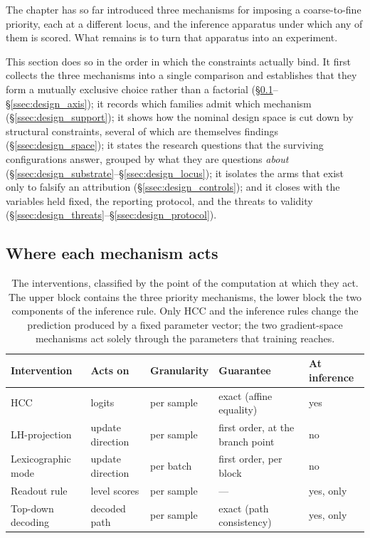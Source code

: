 The chapter has so far introduced three mechanisms for imposing a coarse-to-fine
priority, each at a different locus, and the inference apparatus under which any
of them is scored. What remains is to turn that apparatus into an experiment.

This section does so in the order in which the constraints actually bind. It
first collects the three mechanisms into a single comparison and establishes that
they form a mutually exclusive choice rather than a factorial
(\S\ref{ssec:design_mechanisms}--\S\ref{ssec:design_axis}); it records which
families admit which mechanism (\S\ref{ssec:design_support}); it shows how the
nominal design space is cut down by structural constraints, several of which are
themselves findings (\S\ref{ssec:design_space}); it states the research questions
that the surviving configurations answer, grouped by what they are questions
\emph{about} (\S\ref{ssec:design_substrate}--\S\ref{ssec:design_locus}); it
isolates the arms that exist only to falsify an attribution
(\S\ref{ssec:design_controls}); and it closes with the variables held fixed, the
reporting protocol, and the threats to validity
(\S\ref{ssec:design_threats}--\S\ref{ssec:design_protocol}).

\subsection{Where each mechanism acts}
\label{ssec:design_mechanisms}

\begin{table}[htbp]
\centering
\small
\begin{tabular}{@{}lllll@{}}
\toprule
\textbf{Intervention} & \textbf{Acts on} & \textbf{Granularity} & \textbf{Guarantee} & \textbf{At inference} \\
\midrule
HCC & logits & per sample & exact (affine equality) & yes \\
LH-projection & update direction & per sample & first order, at the branch point & no \\
Lexicographic mode & update direction & per batch & first order, per block & no \\
\midrule
Readout rule & level scores & per sample & --- & yes, only \\
Top-down decoding & decoded path & per sample & exact (path consistency) & yes, only \\
\bottomrule
\end{tabular}
\caption{The interventions, classified by the point of the computation at which
they act. The upper block contains the three priority mechanisms, the lower block
the two components of the inference rule. Only HCC and the inference rules change
the prediction produced by a fixed parameter vector; the two gradient-space
mechanisms act solely through the parameters that training reaches.}
\label{tab:framework_mechanisms}
\end{table}

